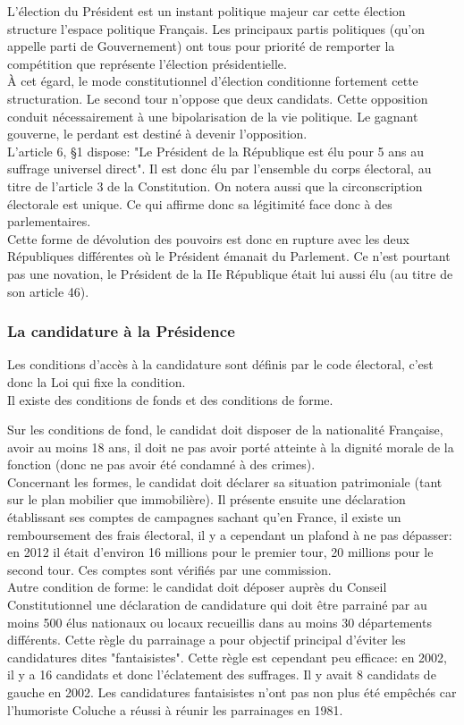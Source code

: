\documentclass[12pt, a4paper, openany]{book}
\begin{document}
L'élection du Président est un instant politique majeur car cette élection structure l'espace politique Français. Les principaux partis politiques (qu'on appelle parti de Gouvernement) ont tous pour priorité de remporter la compétition que représente l'élection présidentielle. \\
À cet égard, le mode constitutionnel d'élection conditionne fortement cette structuration. Le second tour n'oppose que deux candidats. Cette opposition conduit nécessairement à une bipolarisation de la vie politique. Le gagnant gouverne, le perdant est destiné à devenir l'opposition. \\
L'article 6, §1 dispose: "Le Président de la République est élu pour 5 ans au suffrage universel direct". Il est donc élu par l'ensemble du corps électoral, au titre de l'article 3 de la Constitution. On notera aussi que la circonscription électorale est unique. Ce qui affirme donc sa légitimité face donc à des parlementaires. \\
Cette forme de dévolution des pouvoirs est donc en rupture avec les deux Républiques différentes où le Président émanait du Parlement. Ce n'est pourtant pas une novation, le Président de la IIe République était lui aussi élu (au titre de son article 46). 

\subsubsection{La candidature à la Présidence}

Les conditions d'accès à la candidature sont définis par le code électoral, c'est donc la Loi qui fixe la condition. \\
Il existe des conditions de fonds et des conditions de forme.


Sur les conditions de fond, le candidat doit disposer de la nationalité Française, avoir au moins 18 ans, il doit ne pas avoir porté atteinte à la dignité morale de la fonction (donc ne pas avoir été condamné à des crimes). \\
Concernant les formes, le candidat doit déclarer sa situation patrimoniale (tant sur le plan mobilier que immobilière). Il présente ensuite une déclaration établissant ses comptes de campagnes sachant qu'en France, il existe un remboursement des frais électoral, il y a cependant un plafond à ne pas dépasser: en 2012 il était d'environ 16 millions pour le premier tour, 20 millions pour le second tour. Ces comptes sont vérifiés par une commission. \\
Autre condition de forme: le candidat doit déposer auprès du Conseil Constitutionnel une déclaration de candidature qui doit être parrainé par au moins 500 élus nationaux ou locaux recueillis dans au moins 30 départements différents. Cette règle du parrainage a pour objectif principal d'éviter les candidatures dites "fantaisistes". Cette règle est cependant peu efficace: en 2002, il y a 16 candidats et donc l'éclatement des suffrages. Il y avait 8 candidats de gauche en 2002. Les candidatures fantaisistes n'ont pas non plus été empêchés car l'humoriste Coluche a réussi à réunir les parrainages en 1981.
\end{document}
